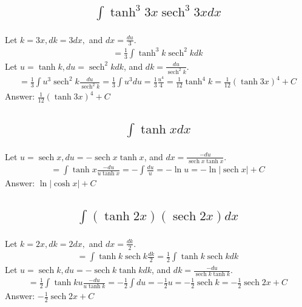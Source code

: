 \documentclass{article}
\DeclareMathOperator{\sech}{sech}
\begin{document}
\subsection{
	\begin{align*}
		\int{\tanh^3 3x \sech^3 3x dx}
	\end{align*}
}
Let $k = 3x, dk = 3dx,$ and $dx = \frac{du}{3}$. 
\begin{align*}
	= \frac{1}{3} \int{\tanh^3{k}\sech^2{k}dk}
\end{align*}
Let $u = \tanh{k}, du = \sech^2{k}dk$, and $dk= \frac{du}{\sech^2{k}}$.
\begin{align*}
	= \frac{1}{3} \int{u^3 \sech^2{k} \frac{du}{\sech^2{k}}} = \frac{1}{3} \int{u^3 du} = \frac{1}{3} \frac{u^4}{4} = \frac{1}{12} \tanh^4{k} = \frac{1}{12} (\tanh{3x})^4 + C
\end{align*}
Answer: $\frac{1}{12} (\tanh{3x})^4 + C$

\subsection{
	\begin{align*}
		\int{\tanh x dx}
	\end{align*}
}
Let $u = \sech{x}, du = -\sech{x}\tanh{x}$, and $dx = \frac{-du}{\sech{x}\tanh{x}}$. 
\begin{align*}
	= \int{\tanh{x} \frac{-du}{u\tanh{x}}} = - \int{\frac{du}{u}} = -\ln{u} = -\ln{|\sech{x}|} + C
\end{align*}
Answer: $\ln{|\cosh{x}|} + C$

\subsection{
	\begin{align*}
		\int{(\tanh 2x) (\sech 2x) dx}
	\end{align*}
}
Let $k = 2x, dk = 2dx,$ and $dx = \frac{dk}{2}$. 
\begin{align*}
	= \int{\tanh{k}\sech{k}\frac{dk}{2}} = \frac{1}{2} \int{\tanh{k}\sech{k}dk}
\end{align*}
Let $u = \sech{k}, du = -\sech{k}\tanh{k}dk$, and $dk = \frac{-du}{\sech{k}\tanh{k}}$.
\begin{align*}
	= \frac{1}{2} \int{\tanh{k}u \frac{-du}{u \tanh{k}}} = -\frac{1}{2} \int{du} = -\frac{1}{2}u = -\frac{1}{2}\sech{k} = -\frac{1}{2}\sech{2x} + C
\end{align*}
Answer: $- \frac{1}{2} \sech{2x} + C$
\end{document}
